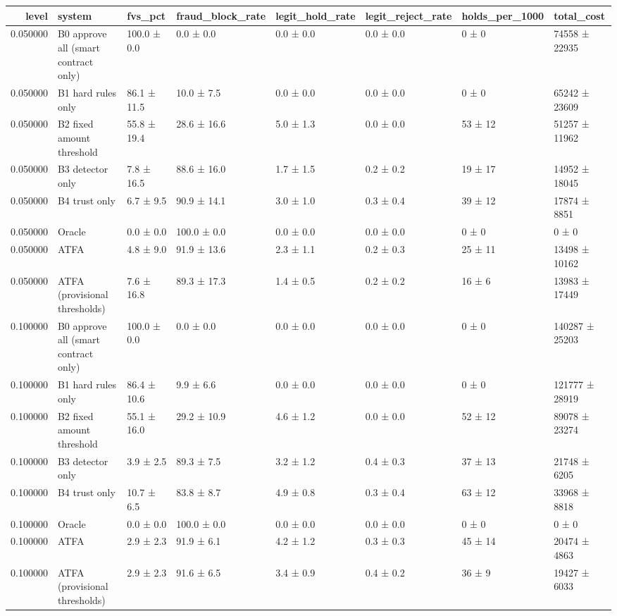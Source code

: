 \begin{tabular}{rlllllll}
\toprule
level & system & fvs\_pct & fraud\_block\_rate & legit\_hold\_rate & legit\_reject\_rate & holds\_per\_1000 & total\_cost \\
\midrule
0.050000 & B0 approve all (smart contract only) & 100.0 ± 0.0 & 0.0 ± 0.0 & 0.0 ± 0.0 & 0.0 ± 0.0 & 0 ± 0 & 74558 ± 22935 \\
0.050000 & B1 hard rules only & 86.1 ± 11.5 & 10.0 ± 7.5 & 0.0 ± 0.0 & 0.0 ± 0.0 & 0 ± 0 & 65242 ± 23609 \\
0.050000 & B2 fixed amount threshold & 55.8 ± 19.4 & 28.6 ± 16.6 & 5.0 ± 1.3 & 0.0 ± 0.0 & 53 ± 12 & 51257 ± 11962 \\
0.050000 & B3 detector only & 7.8 ± 16.5 & 88.6 ± 16.0 & 1.7 ± 1.5 & 0.2 ± 0.2 & 19 ± 17 & 14952 ± 18045 \\
0.050000 & B4 trust only & 6.7 ± 9.5 & 90.9 ± 14.1 & 3.0 ± 1.0 & 0.3 ± 0.4 & 39 ± 12 & 17874 ± 8851 \\
0.050000 & Oracle & 0.0 ± 0.0 & 100.0 ± 0.0 & 0.0 ± 0.0 & 0.0 ± 0.0 & 0 ± 0 & 0 ± 0 \\
0.050000 & ATFA & 4.8 ± 9.0 & 91.9 ± 13.6 & 2.3 ± 1.1 & 0.2 ± 0.3 & 25 ± 11 & 13498 ± 10162 \\
0.050000 & ATFA (provisional thresholds) & 7.6 ± 16.8 & 89.3 ± 17.3 & 1.4 ± 0.5 & 0.2 ± 0.2 & 16 ± 6 & 13983 ± 17449 \\
0.100000 & B0 approve all (smart contract only) & 100.0 ± 0.0 & 0.0 ± 0.0 & 0.0 ± 0.0 & 0.0 ± 0.0 & 0 ± 0 & 140287 ± 25203 \\
0.100000 & B1 hard rules only & 86.4 ± 10.6 & 9.9 ± 6.6 & 0.0 ± 0.0 & 0.0 ± 0.0 & 0 ± 0 & 121777 ± 28919 \\
0.100000 & B2 fixed amount threshold & 55.1 ± 16.0 & 29.2 ± 10.9 & 4.6 ± 1.2 & 0.0 ± 0.0 & 52 ± 12 & 89078 ± 23274 \\
0.100000 & B3 detector only & 3.9 ± 2.5 & 89.3 ± 7.5 & 3.2 ± 1.2 & 0.4 ± 0.3 & 37 ± 13 & 21748 ± 6205 \\
0.100000 & B4 trust only & 10.7 ± 6.5 & 83.8 ± 8.7 & 4.9 ± 0.8 & 0.3 ± 0.4 & 63 ± 12 & 33968 ± 8818 \\
0.100000 & Oracle & 0.0 ± 0.0 & 100.0 ± 0.0 & 0.0 ± 0.0 & 0.0 ± 0.0 & 0 ± 0 & 0 ± 0 \\
0.100000 & ATFA & 2.9 ± 2.3 & 91.9 ± 6.1 & 4.2 ± 1.2 & 0.3 ± 0.3 & 45 ± 14 & 20474 ± 4863 \\
0.100000 & ATFA (provisional thresholds) & 2.9 ± 2.3 & 91.6 ± 6.5 & 3.4 ± 0.9 & 0.4 ± 0.2 & 36 ± 9 & 19427 ± 6033 \\

\end{tabular}
